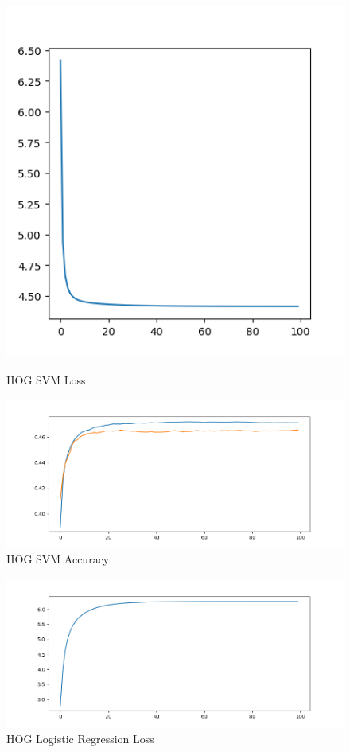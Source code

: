 \documentclass[11pt]{article}
\begin{document}
\begin{figure}[h]
	\begin{minipage}{0.5 \textwidth}
		\centering
		\includegraphics[width=0.8 \textwidth]{figure/HOG_SVM_Loss.png}
		\caption{HOG SVM Loss}
		\label{fig:HOG_SVM_Loss}
	\end{minipage}
	\begin{minipage}{0.5 \textwidth}
		\centering
		\includegraphics[width=1.4 \textwidth]{figure/HOG_SVM_Acc.png}
		\caption{HOG SVM Accuracy}
		\label{fig:HOG_SVM_Acc}
	\end{minipage}
\end{figure}
\begin{figure}[h]
	\centering
	\includegraphics[width=0.5 \textwidth]{figure/HOG_Log_Loss.png}
	\caption{HOG Logistic Regression Loss}
	\label{fig:HOG_Log_Loss}
\end{figure}
\end{document}
